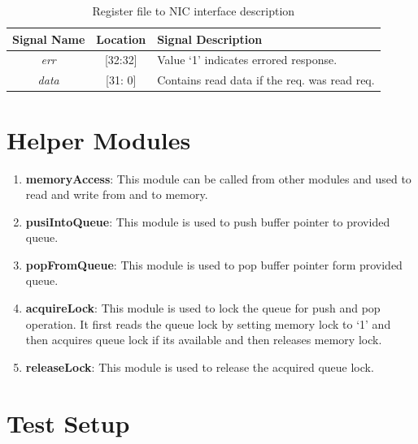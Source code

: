 \documentclass[12pt]{report}
\begin{document}
				\begin{table}[!htbp]
					\centering
					\begin{tabular}{ccl}
						\hline
						\textbf{Signal Name} 		& \textbf{Location} 		&\textbf{Signal Description}  \\ \hline
						\textit{err}			& [32:32]			& Value `1' indicates errored response.\\\hline
						\textit{data}   		& [31: 0] 			& Contains read data if the req. was read req.\\ \hline
					\end{tabular}
					\caption{ Register file to NIC interface description}
					\label{tab:Reg-NIC-interface-resp}
				\end{table}


		\section{Helper Modules}
			\begin{enumerate}
				\item \textbf{memoryAccess}: This module can be called from other modules and used to read and write from and to memory. 
				\item \textbf{pusiIntoQueue}: This module is used to push buffer pointer to provided queue. 
				\item \textbf{popFromQueue}: This module is used to pop buffer pointer form provided queue. 
				\item \textbf{acquireLock}: This module is used to lock the queue for push and pop operation. It first reads the queue lock by setting memory lock to `1' and then acquires queue lock if its available and then releases memory lock.
				\item \textbf{releaseLock}: This module is used to release the acquired queue lock.
			\end{enumerate}	

	\section{Test Setup}
\end{document}
